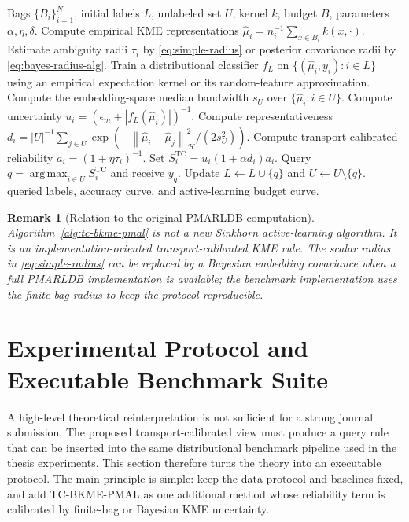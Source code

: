\documentclass[10pt,journal]{IEEEtran}
\newtheorem{remark}{Remark}
\DeclareMathOperator*{\argmax}{arg\,max}
\newcommand{\Hcal}{\mathcal{H}}
\newcommand{\wh}{\widehat}
\newcommand{\norm}[1]{\left\lVert #1 \right\rVert}
\begin{document}
\begin{algorithm}[t]
\caption{Transport-Calibrated Bayesian KME-PMAL (TC-BKME-PMAL)}
\label{alg:tc-bkme-pmal}
\begin{algorithmic}[1]
\REQUIRE Bags $\{B_i\}_{i=1}^N$, initial labels $L$, unlabeled set $U$, kernel $k$, budget $B$, parameters $\alpha,\eta,\delta$.
\STATE Compute empirical KME representations $\wh\mu_i=n_i^{-1}\sum_{x\in B_i}k(x,\cdot)$.
\STATE Estimate ambiguity radii $\tau_i$ by \eqref{eq:simple-radius} or posterior covariance radii by \eqref{eq:bayes-radius-alg}.
    \STATE Train a distributional classifier $f_L$ on $\{(\wh\mu_i,y_i):i\in L\}$ using an empirical expectation kernel or its random-feature approximation.
    \STATE Compute the embedding-space median bandwidth $s_U$ over $\{\wh\mu_i:i\in U\}$.
        \STATE Compute uncertainty $u_i=(\epsilon_m+|f_L(\wh\mu_i)|)^{-1}$.
        \STATE Compute representativeness $d_i=|U|^{-1}\sum_{j\in U}\exp(-\norm{\wh\mu_i-\wh\mu_j}_{\Hcal}^2/(2s_U^2))$.
        \STATE Compute transport-calibrated reliability $a_i=(1+\eta\tau_i)^{-1}$.
        \STATE Set $S_i^{\mathrm{TC}}=u_i(1+\alpha d_i)a_i$.
    \ENDFOR
    \STATE Query $q=\argmax_{i\in U}S_i^{\mathrm{TC}}$ and receive $y_q$.
    \STATE Update $L\leftarrow L\cup\{q\}$ and $U\leftarrow U\setminus\{q\}$.
\ENDFOR
\RETURN queried labels, accuracy curve, and active-learning budget curve.
\end{algorithmic}
\end{algorithm}

\begin{remark}[Relation to the original PMARLDB computation]
Algorithm~\ref{alg:tc-bkme-pmal} is not a new Sinkhorn active-learning algorithm. It is an implementation-oriented transport-calibrated KME rule. The scalar radius in \eqref{eq:simple-radius} can be replaced by a Bayesian embedding covariance when a full PMARLDB implementation is available; the benchmark implementation uses the finite-bag radius to keep the protocol reproducible.
\end{remark}


\section{Experimental Protocol and Executable Benchmark Suite}
\label{sec:experiments}

A high-level theoretical reinterpretation is not sufficient for a strong journal submission. The proposed transport-calibrated view must produce a query rule that can be inserted into the same distributional benchmark pipeline used in the thesis experiments. This section therefore turns the theory into an executable protocol. The main principle is simple: keep the data protocol and baselines fixed, and add TC-BKME-PMAL as one additional method whose reliability term is calibrated by finite-bag or Bayesian KME uncertainty.
\end{document}
